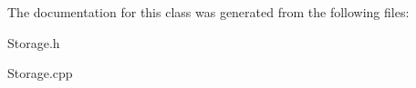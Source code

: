 

The documentation for this class was generated from the following files\+:\begin{DoxyCompactItemize}
\item 
Storage.\+h\item 
Storage.\+cpp\end{DoxyCompactItemize}
